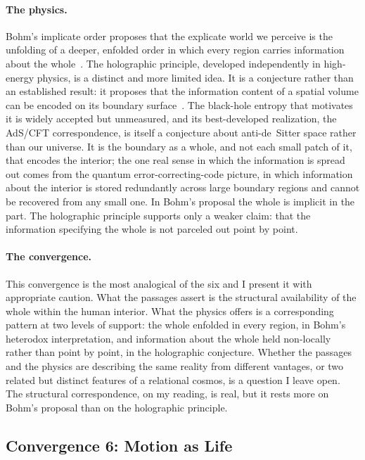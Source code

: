 \paragraph{The physics.}
Bohm's implicate order proposes that the explicate world we perceive is
the unfolding of a deeper, enfolded order in which every region carries
information about the whole~\citep{Bohm1980}.
The holographic principle, developed independently in high-energy physics,
is a distinct and more limited idea.
It is a conjecture rather than an established result: it proposes that the
information content of a spatial volume can be encoded on its boundary
surface~\citep{tHooft1993,Susskind1995}.
The black-hole entropy that motivates it is widely accepted but unmeasured, and
its best-developed realization, the AdS/CFT correspondence, is itself a
conjecture about anti-de~Sitter space rather than our universe.
It is the boundary as a whole, and not each small patch of it, that encodes the
interior; the one real sense in which the information is spread out comes from
the quantum error-correcting-code picture, in which information about the
interior is stored redundantly across large boundary regions and cannot be
recovered from any small one.
In Bohm's proposal the whole is implicit in the part.
The holographic principle supports only a weaker claim: that the information
specifying the whole is not parceled out point by point.

\paragraph{The convergence.}
This convergence is the most analogical of the six and I present it with
appropriate caution.
What the \bahai passages assert is the structural availability of the whole
within the human interior.
What the physics offers is a corresponding pattern at two levels of support:
the whole enfolded in every region, in Bohm's heterodox interpretation, and
information about the whole held non-locally rather than point by point, in the
holographic conjecture.
Whether the \bahai passages and the physics are describing the same reality
from different vantages, or two related but distinct features of a relational
cosmos, is a question I leave open.
The structural correspondence, on my reading, is real, but it rests more on
Bohm's proposal than on the holographic principle.

\subsection{Convergence 6: Motion as Life}

